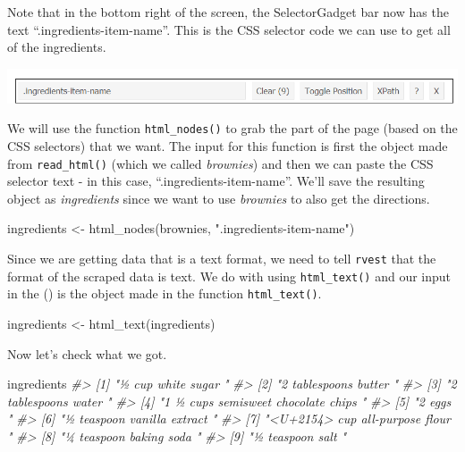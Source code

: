 \documentclass[
]{krantz}
\makeatletter
\newenvironment{Shaded}{\begin{snugshade}}{\end{snugshade}}
\newcommand{\CommentTok}[1]{\textcolor[rgb]{0.37,0.37,0.37}{\textit{#1}}}
\newcommand{\FunctionTok}[1]{\textcolor[rgb]{0,0,0}{#1}}
\newcommand{\NormalTok}[1]{#1}
\newcommand{\OtherTok}[1]{\textcolor[rgb]{0.37,0.37,0.37}{#1}}
\newcommand{\StringTok}[1]{\textcolor[rgb]{0.5,0.5,0.5}{#1}}
\newenvironment{kframe}{%
\medskip{}
\setlength{\fboxsep}{.8em}
 \def\at@end@of@kframe{}%
 \ifinner\ifhmode%
  \def\at@end@of@kframe{\end{minipage}}%
  \begin{minipage}{\columnwidth}%
 \fi\fi%
 \def\FrameCommand##1{\hskip\@totalleftmargin \hskip-\fboxsep
 \colorbox{shadecolor}{##1}\hskip-\fboxsep
     \hskip-\linewidth \hskip-\@totalleftmargin \hskip\columnwidth}%
 \MakeFramed {\advance\hsize-\width
   \@totalleftmargin\z@ \linewidth\hsize
   \@setminipage}}%
 {\par\unskip\endMakeFramed%
 \at@end@of@kframe}
\renewenvironment{Shaded}{\begin{kframe}}{\end{kframe}}
\makeatother
\begin{document}
Note that in the bottom right of the screen, the SelectorGadget bar now has the text ``.ingredients-item-name''. This is the CSS selector code we can use to get all of the ingredients.

\includegraphics{images/brownies_4.PNG}

We will use the function \texttt{html\_nodes()} to grab the part of the page (based on the CSS selectors) that we want. The input for this function is first the object made from \texttt{read\_html()} (which we called \emph{brownies}) and then we can paste the CSS selector text - in this case, ``.ingredients-item-name''. We'll save the resulting object as \emph{ingredients} since we want to use \emph{brownies} to also get the directions.

\begin{Shaded}
\begin{Highlighting}[]
\NormalTok{ingredients }\OtherTok{\textless{}{-}} \FunctionTok{html\_nodes}\NormalTok{(brownies, }\StringTok{".ingredients{-}item{-}name"}\NormalTok{)}
\end{Highlighting}
\end{Shaded}

Since we are getting data that is a text format, we need to tell \texttt{rvest} that the format of the scraped data is text. We do with using \texttt{html\_text()} and our input in the () is the object made in the function \texttt{html\_text()}.

\begin{Shaded}
\begin{Highlighting}[]
\NormalTok{ingredients }\OtherTok{\textless{}{-}} \FunctionTok{html\_text}\NormalTok{(ingredients)}
\end{Highlighting}
\end{Shaded}

Now let's check what we got.

\begin{Shaded}
\begin{Highlighting}[]
\NormalTok{ingredients}
\CommentTok{\#\textgreater{} [1] "½ cup white sugar "                 }
\CommentTok{\#\textgreater{} [2] "2 tablespoons butter "              }
\CommentTok{\#\textgreater{} [3] "2 tablespoons water "               }
\CommentTok{\#\textgreater{} [4] "1 ½ cups semisweet chocolate chips "}
\CommentTok{\#\textgreater{} [5] "2 eggs "                            }
\CommentTok{\#\textgreater{} [6] "½ teaspoon vanilla extract "        }
\CommentTok{\#\textgreater{} [7] "\textless{}U+2154\textgreater{} cup all{-}purpose flour "    }
\CommentTok{\#\textgreater{} [8] "¼ teaspoon baking soda "            }
\CommentTok{\#\textgreater{} [9] "½ teaspoon salt "}
\end{Highlighting}
\end{Shaded}
\end{document}
